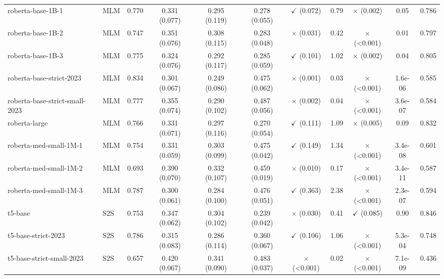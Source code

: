 \begin{table}[]
\begin{adjustbox}{max width=\textwidth}
\begin{tabular}{llccccccccc}
roberta-base-1B-1 & MLM & 0.770 & 0.331 (0.077) & 0.295 (0.119) & 0.278 (0.055) & $\checkmark$ (0.072) & 0.79 & $\times$ (0.002) & 0.05 & 0.786 \\
roberta-base-1B-2 & MLM & 0.747 & 0.351 (0.076) & 0.308 (0.115) & 0.283 (0.048) & $\times$ (0.031) & 0.42 & $\times$ (<0.001) & 0.01 & 0.797 \\
roberta-base-1B-3 & MLM & 0.775 & 0.324 (0.076) & 0.292 (0.117) & 0.285 (0.059) & $\checkmark$ (0.101) & 1.02 & $\times$ (0.002) & 0.04 & 0.805 \\
roberta-base-strict-2023 & MLM & 0.834 & 0.301 (0.067) & 0.249 (0.086) & 0.475 (0.062) & $\times$ (0.001) & 0.03 & $\times$ (<0.001) & 1.6e-06 & 0.585 \\
roberta-base-strict-small-2023 & MLM & 0.777 & 0.355 (0.074) & 0.290 (0.102) & 0.487 (0.056) & $\times$ (0.002) & 0.04 & $\times$ (<0.001) & 3.6e-07 & 0.584 \\
roberta-large & MLM & 0.766 & 0.331 (0.071) & 0.297 (0.116) & 0.270 (0.054) & $\checkmark$ (0.111) & 1.09 & $\times$ (0.005) & 0.09 & 0.832 \\
roberta-med-small-1M-1 & MLM & 0.754 & 0.331 (0.059) & 0.303 (0.099) & 0.475 (0.042) & $\checkmark$ (0.149) & 1.34 & $\times$ (<0.001) & 3.4e-08 & 0.601 \\
roberta-med-small-1M-2 & MLM & 0.693 & 0.390 (0.070) & 0.332 (0.107) & 0.459 (0.019) & $\times$ (0.010) & 0.17 & $\times$ (<0.001) & 3.4e-11 & 0.587 \\
roberta-med-small-1M-3 & MLM & 0.787 & 0.300 (0.061) & 0.284 (0.100) & 0.476 (0.051) & $\checkmark$ (0.363) & 2.38 & $\times$ (<0.001) & 2.3e-07 & 0.594 \\
t5-base & S2S & 0.753 & 0.347 (0.062) & 0.304 (0.102) & 0.239 (0.042) & $\times$ (0.030) & 0.41 & $\checkmark$ (0.085) & 0.90 & 0.846 \\
t5-base-strict-2023 & S2S & 0.786 & 0.315 (0.083) & 0.286 (0.114) & 0.360 (0.067) & $\checkmark$ (0.106) & 1.06 & $\times$ (<0.001) & 5.3e-04 & 0.748 \\
t5-base-strict-small-2023 & S2S & 0.657 & 0.420 (0.067) & 0.341 (0.090) & 0.483 (0.037) & $\times$ (<0.001) & 0.02 & $\times$ (<0.001) & 7.1e-09 & 0.436 \\
\bottomrule
\end{tabular}
\end{adjustbox}
\end{table}
